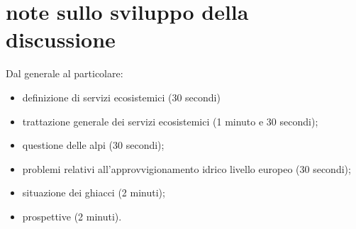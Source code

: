 \documentclass[12pt,a4paper]{article}
\begin{document}
	
	
	\newpage
	\appendix
	\section{note sullo sviluppo della discussione}
	Dal generale al particolare:
	\begin{itemize}
		\item definizione di servizi ecosistemici (30 secondi)
		\item trattazione generale dei servizi ecosistemici (1 minuto e 30 secondi);
		\item questione delle alpi (30 secondi);
		\item problemi relativi all'approvvigionamento idrico livello europeo (30 secondi);
		\item situazione dei ghiacci (2 minuti);
		\item prospettive  (2 minuti).
	\end{itemize}
\end{document}
